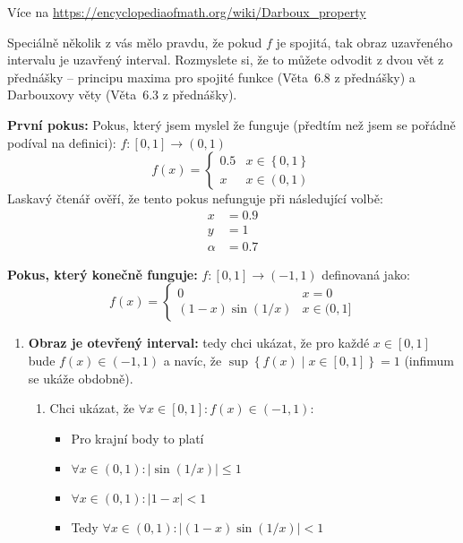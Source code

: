 \begin{enumerate}
{			Více na \url{https://encyclopediaofmath.org/wiki/Darboux_property}

			Speciálně několik z vás mělo pravdu, že pokud $f$ je spojitá, tak obraz uzavřeného intervalu je uzavřený interval.
			Rozmyslete si, že to můžete odvodit z dvou vět z přednášky -- principu maxima pro spojité funkce (Věta~6.8 z přednášky) a Darbouxovy věty (Věta~6.3 z přednášky).

			\textbf{První pokus:}
			Pokus, který jsem myslel že funguje (předtím než jsem se pořádně podíval na definici):
			$f \colon [0,1] \rightarrow (0,1)$
			$$
			f(x) = 
			\begin{cases}
				0.5 & x \in \left\{ 0,1 \right\} \\
				x & x \in (0,1)
			\end{cases}
			$$
			Laskavý čtenář ověří, že tento pokus nefunguje při následující volbě:
			\begin{align*}
				x &= 0.9 \\
				y &= 1 \\
				\alpha&=0.7
			\end{align*}

			\textbf{Pokus, který konečně funguje:}
			$f \colon [0,1] \rightarrow (-1,1)$ definovaná jako:
			$$
			f(x) = 
			\begin{cases}
				0 & x = 0 \\
				(1-x) \sin(1/x) & x \in (0,1]
			\end{cases}
			$$

			\begin{enumerate}

				\item  \textbf{Obraz je otevřený interval:}
					tedy chci ukázat, že pro každé $x \in [0,1]$ bude $f(x) \in (-1, 1)$
					a navíc, že $\sup\left\{ f(x) \mid x \in [0,1] \right\} = 1$ (infimum se ukáže obdobně).
					\begin{enumerate}

						\item  Chci ukázat, že $\forall x \in [0,1] \colon f(x) \in (-1,1)$:
							\begin{itemize}
								\item  Pro krajní body to platí
								\item  $\forall x \in (0,1) \colon |\sin(1/x)| \leq 1$
								\item  $\forall x \in (0,1) \colon |1-x| < 1$
								\item  Tedy $\forall x \in (0,1) \colon |(1-x) \sin(1/x)| < 1$
							\end{itemize}


\end{enumerate}
\end{enumerate}}
\end{enumerate}
